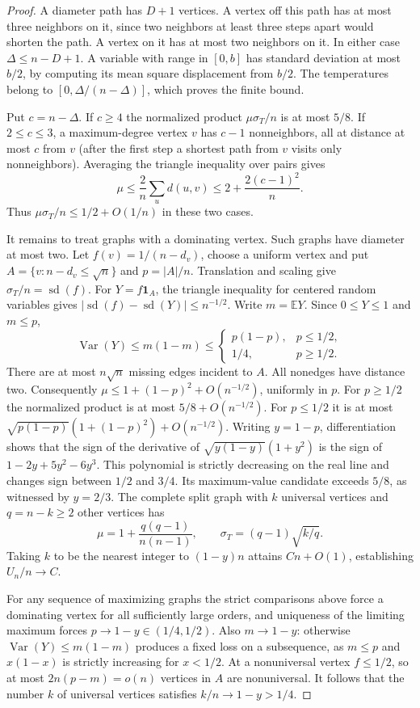 \documentclass[11pt,a4paper]{article}
\theoremstyle{remark}\newtheorem*{remark}{Remark}
\begin{document}
\begin{proof}
A diameter path has $D+1$ vertices. A vertex off this path has at most
three neighbors on it, since two neighbors at least three steps apart
would shorten the path. A vertex on it has at most two neighbors on it.
In either case $\Delta\le n-D+1$. A variable with range in $[0,b]$
has standard deviation at most $b/2$, by computing its mean square
displacement from $b/2$. The temperatures belong to
$[0,\Delta/(n-\Delta)]$, which proves the finite bound.

Put $c=n-\Delta$. If $c\ge4$ the normalized product $\mu\sigma_T/n$
is at most $5/8$. If $2\le c\le3$, a maximum-degree vertex $v$ has
$c-1$ nonneighbors, all at distance at most $c$ from $v$ (after the first
step a shortest path from $v$ visits only nonneighbors). Averaging the
triangle inequality over pairs gives
\[
 \mu\le\frac2n\sum_{u}d(u,v)\le2+\frac{2(c-1)^2}{n}.
\]
Thus $\mu\sigma_T/n\le1/2+O(1/n)$ in these two cases.

It remains to treat graphs with a dominating vertex. Such graphs have
diameter at most two. Let $f(v)=1/(n-d_v)$, choose a uniform vertex
and put $A=\{v:n-d_v\le\sqrt n\}$ and $p=|A|/n$. Translation and
scaling give $\sigma_T/n=\operatorname{sd}(f)$. For
$Y=f\mathbf1_A$, the triangle inequality for centered random variables
gives $\left|\operatorname{sd}(f)-\operatorname{sd}(Y)\right|
\le n^{-1/2}$. Write $m=\mathbb EY$. Since $0\le Y\le1$ and $m\le p$,
\[
 \operatorname{Var}(Y)\le m(1-m)\le
 \begin{cases}p(1-p),&p\le1/2,\\1/4,&p\ge1/2.\end{cases}
\]
There are at most $n\sqrt n$ missing edges incident to $A$. All
nonedges have distance two. Consequently
$\mu\le1+(1-p)^2+O(n^{-1/2})$, uniformly in $p$.
For $p\ge1/2$ the normalized product is at most $5/8+O(n^{-1/2})$.
For $p\le1/2$ it is at most
$\sqrt{p(1-p)}(1+(1-p)^2)+O(n^{-1/2})$.
Writing $y=1-p$, differentiation shows that the sign of the derivative
of $\sqrt{y(1-y)}(1+y^2)$ is the sign of $1-2y+5y^2-6y^3$.
This polynomial is strictly decreasing on the real line and changes
sign between $1/2$ and $3/4$. Its maximum-value candidate exceeds $5/8$,
as witnessed by $y=2/3$. The complete split graph with $k$ universal
vertices and $q=n-k\ge2$ other vertices has
\[
 \mu=1+\frac{q(q-1)}{n(n-1)},\qquad
 \sigma_T=(q-1)\sqrt{k/q}.
\]
Taking $k$ to be the nearest integer to $(1-y)n$ attains
$Cn+O(1)$, establishing $U_n/n\to C$.

For any sequence of maximizing graphs the strict comparisons above force
a dominating vertex for all sufficiently large orders, and uniqueness
of the limiting maximum forces $p\to1-y\in(1/4,1/2)$. Also
$m\to1-y$: otherwise $\operatorname{Var}(Y)\le m(1-m)$ produces
a fixed loss on a subsequence, as $m\le p$ and $x(1-x)$ is strictly
increasing for $x<1/2$. At a nonuniversal vertex $f\le1/2$, so at most
$2n(p-m)=o(n)$ vertices in $A$ are nonuniversal. It follows that the
number $k$ of universal vertices satisfies $k/n\to1-y>1/4$.


\end{proof}
\end{document}
